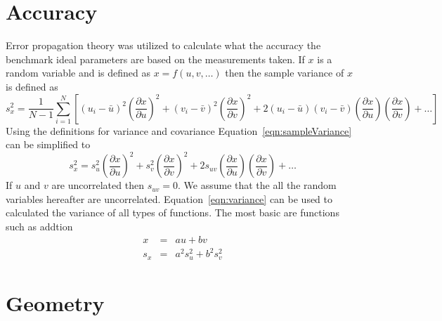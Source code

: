 \documentclass{bmd2010p}
\begin{document}
\section{Accuracy}
Error propagation theory was utilized to calculate what the accuracy the
benchmark ideal parameters are based on the measurements taken. If $x$ is a
random variable and is defined as $x=f(u,v,\ldots)$ then the sample variance of
$x$ is defined as
\begin{equation}
    s_x^2 = \frac{1}{N-1}\sum^N_{i=1}
    \left[(u_i - \bar{u})^2\left(\frac{\partial x}{\partial u}\right)^2 +
    (v_i - \bar{v})^2\left(\frac{\partial x}{\partial v}\right)^2 +
    2(u_i - \bar{u})(v_i - \bar{v})\left(\frac{\partial x}{\partial u}\right)\left(\frac{\partial x}{\partial v}\right)
    + \ldots\right]
    \label{eqn:sampleVariance}
\end{equation}
Using the definitions for variance and covariance
Equation~\ref{eqn:sampleVariance} can be simplified to
\begin{equation}
    s_x^2 = s_u^2\left(\frac{\partial x}{\partial u}\right)^2 +
            s_v^2\left(\frac{\partial x}{\partial v}\right)^2 +
            2s_{uv}\left(\frac{\partial x}{\partial u}\right)\left(\frac{\partial x}{\partial v}\right)
            + \ldots
    \label{eqn:variance}
\end{equation}
If $u$ and $v$ are uncorrelated then $s_{uv}=0$. We assume that the all the
random variables hereafter are uncorrelated. Equation~\ref{eqn:variance} can be
used to calculated the variance of all types of functions. The most basic are
functions such as addtion
\begin{eqnarray}
    \label{eqn:addition}
    x &=&  au + bv\\
    s_x &=& a^2s_u^2 + b^2s_v^2
\end{eqnarray}

\section{Geometry}
\end{document}
